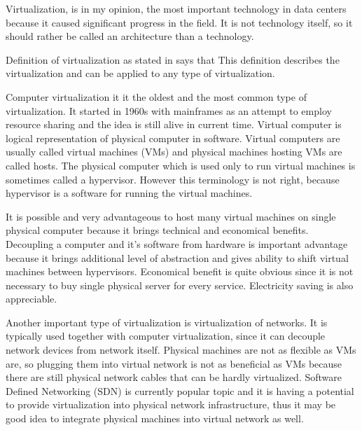 
Virtualization, is in my opinion, the most important technology in data centers because it caused significant progress in the field. It is not technology itself, so it should rather be called an architecture than a technology.

Definition of virtualization as stated in \cite{virtualization-in-education} says that  This definition describes the virtualization and can be applied to any type of virtualization.

Computer virtualization it it the oldest and the most common type of virtualization.
It started in 1960s with mainframes as an attempt to employ resource sharing and the idea is still alive in current time. 
Virtual computer is logical representation of physical computer in software. \cite{virtualization-in-education} Virtual computers are usually called virtual machines (\Ac{VM}s) and physical machines hosting \Ac{VM}s are called hosts. 
The physical computer which is used only to run virtual machines is sometimes called a hypervisor. However this terminology is not right, because hypervisor is a software for running the virtual machines.

It is possible and very advantageous to host many virtual machines on single physical computer because it brings technical and economical benefits. Decoupling a computer and it's software from hardware is important advantage because it brings additional level of abstraction and gives ability to shift virtual machines between hypervisors. Economical benefit is quite obvious since it is not necessary to buy single physical server for every service. Electricity saving is also appreciable.

Another important type of virtualization is virtualization of networks. It is typically used together with computer virtualization, since it can decouple network devices from network itself. Physical machines are not as flexible as \Ac{VM}s are, so plugging them into virtual network is not as beneficial as \Ac{VM}s because there are still physical network cables that can be hardly virtualized. Software Defined Networking (\Ac{SDN}) is currently popular topic and it is having a potential to provide virtualization into physical network infrastructure, thus it may be good idea to integrate physical machines into virtual network as well.

